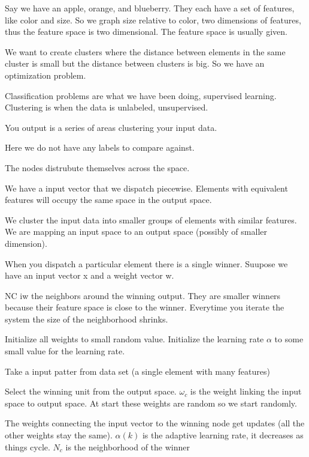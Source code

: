 \documentclass{article}
\begin{document}
Say we have an apple, orange, and blueberry. They each have a set of features, like color and size. So we graph size relative to color, two dimensions of features, thus the feature space is two dimensional. The feature space is usually given.

We want to create clusters where the distance between elements in the same cluster is small but the distance between clusters is big. So we have an optimization problem.

Classification problems are what we have been doing, supervised learning. Clustering is when the data is unlabeled, unsupervised.


You output is a series of areas clustering your input data.


Here we do not have any labels to compare against.


The nodes distrubute themselves across the space.



 We have a input vector that we dispatch piecewise. Elements with equivalent features will occupy the same space in the output space.


We cluster the input data into smaller groups of elements with similar features. We are mapping an input space to an output space (possibly of smaller dimension).

When you dispatch a particular element there is a single winner. Suupose we have an input vector x and a weight vector w.


NC iw the neighbors around the winning output. They are smaller winners because their feature space is close to the winner. Everytime you iterate the system the size of the neighborhood shrinks.




Initialize all weights to small random value. Initialize the learning rate $\alpha$ to some small value for the learning rate.

Take a input patter from data set (a single element with many features)

Select the winning unit from the output space. $\omega_c$ is the weight linking the input space to output space. At start these weights are random so we start randomly.

The weights connecting the input vector to the winning node get updates (all the other weights stay the same). $\alpha(k)$ is the adaptive learning rate, it decreases as things cycle. $N_c$ is the neighborhood of the winner
\end{document}
